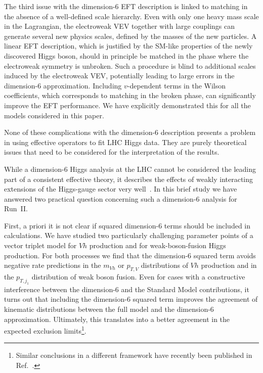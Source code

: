 The third issue with the dimension-6 EFT description is linked to
matching in the absence of a well-defined scale hierarchy.  Even with
only one heavy mass scale in the Lagrangian, the electroweak VEV
together with large couplings can generate several new physics scales,
defined by the masses of the new particles.  A linear EFT description,
which is justified by the SM-like properties of the newly discovered
Higgs boson, should in principle be matched in the phase where the
electroweak symmetry is unbroken. Such a procedure is blind to
additional scales induced by the electroweak VEV, potentially leading
to large errors in the dimension-6 approximation.  Including
$v$-dependent terms in the Wilson coefficients, which corresponds to
matching in the broken phase, can significantly improve the EFT
performance. We have explicitly demonstrated this for all the models
considered in this paper.

None of these complications with the dimension-6 description presents
a problem in using effective operators to fit LHC Higgs data.  They
are purely theoretical issues that need to be considered for the
interpretation of the results.



While a dimension-6 Higgs analysis at the LHC cannot be considered the
leading part of a consistent effective theory, it describes the
effects of weakly interacting extensions of the Higgs-gauge sector very
well~\cite{too_long}. In this brief study we have answered two practical
question concerning such a dimension-6 analysis for Run~II.

First, a priori it is not clear if squared dimension-6 terms should be
included in calculations. We have studied two particularly challenging
parameter points of a vector triplet model for $Vh$ production and for
weak-boson-fusion Higgs production. For both processes we find that
the dimension-6 squared term avoids negative rate predictions in the
$m_{Vh}$ or $p_{T,V}$ distributions of $Vh$ production and in the
$p_{T,j_1}$ distribution of weak boson fusion. Even for cases with a
constructive interference between the dimension-6 and the Standard
Model contributions, it turns out that including the dimension-6
squared term improves the agreement of kinematic distributions between
the full model and the dimension-6 approximation. Ultimately, this
translates into a better agreement in the expected exclusion
limits\footnote{Similar conclusions in a different framework have recently
been published in Ref.~\cite{gino}.}.

